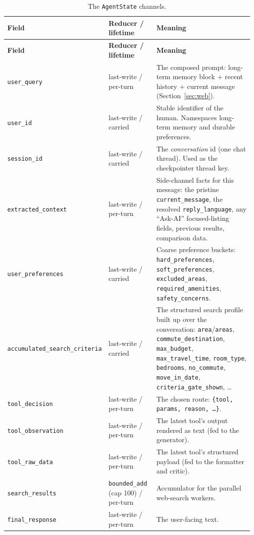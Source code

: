 \documentclass[11pt,a4paper]{article}
\newcommand{\code}[1]{\texttt{\small #1}}
\begin{document}
\begin{longtable}{@{}p{} p{} p{}@{}}
\caption{The \code{AgentState} channels.}\label{tab:state}\\
\toprule
\textbf{Field} & \textbf{Reducer / lifetime} & \textbf{Meaning}\\
\midrule
\endfirsthead
\toprule
\textbf{Field} & \textbf{Reducer / lifetime} & \textbf{Meaning}\\
\midrule
\endhead
\code{user\_query} & last-write / per-turn & The composed prompt: long-term memory block $+$ recent history $+$ current message (Section~\ref{sec:web}).\\
\code{user\_id} & last-write / carried & Stable identifier of the human. Namespaces long-term memory and durable preferences.\\
\code{session\_id} & last-write / carried & The \emph{conversation} id (one chat thread). Used as the checkpointer thread key.\\
\code{extracted\_context} & last-write / per-turn & Side-channel facts for this message: the pristine \code{current\_message}, the resolved \code{reply\_language}, any ``Ask-AI'' focused-listing fields, previous results, comparison data.\\
\code{user\_preferences} & last-write / carried & Coarse preference buckets: \code{hard\_preferences}, \code{soft\_preferences}, \code{excluded\_areas}, \code{required\_amenities}, \code{safety\_concerns}.\\
\code{accumulated\_\allowbreak search\_\allowbreak criteria} & last-write / carried & The structured search profile built up over the conversation: \code{area}/\code{areas}, \code{commute\_destination}, \code{max\_budget}, \code{max\_travel\_time}, \code{room\_type}, \code{bedrooms}, \code{no\_commute}, \code{move\_in\_date}, \code{criteria\_gate\_shown}, \dots\\
\code{tool\_decision} & last-write / per-turn & The chosen route: \code{\{tool, params, reason, \dots\}}.\\
\code{tool\_observation} & last-write / per-turn & The latest tool's output rendered as text (fed to the generator).\\
\code{tool\_raw\_data} & last-write / per-turn & The latest tool's structured payload (fed to the formatter and critic).\\
\code{search\_results} & \code{bounded\_add} (cap 100) / per-turn & Accumulator for the parallel web-search workers.\\
\code{final\_response} & last-write / per-turn & The user-facing text.\\

\end{longtable}
\end{document}
